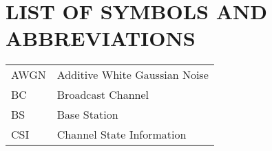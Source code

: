 \section*{LIST OF SYMBOLS AND ABBREVIATIONS}
 {}

\begin{tabular}{ l l }
\hspace{1cm} AWGN & \hspace{4cm} Additive White Gaussian Noise \\  
\hspace{1cm} BC & \hspace{4cm} Broadcast Channel    \\
\hspace{1cm} BS  & \hspace{4cm} Base Station\\
\hspace{1cm} CSI & \hspace{4cm} Channel State Information \\  
\end{tabular}  

\newpage